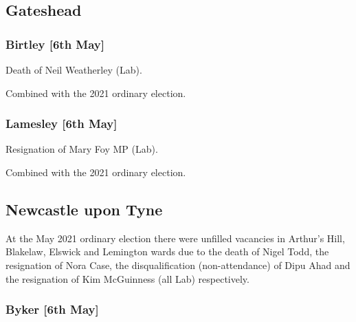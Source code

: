\documentclass[a4paper,openany]{book}
\begin{document}
\begin{resultsiii}
\subsection*{Gateshead}

\subsubsection*{Birtley \hspace*{\fill}\nolinebreak[1]%
	\enspace\hspace*{\fill}
	[6th May]}


Death of Neil Weatherley (Lab).

Combined with the 2021 ordinary election.

\subsubsection*{Lamesley \hspace*{\fill}\nolinebreak[1]%
	\enspace\hspace*{\fill}
	[6th May]}


Resignation of Mary Foy MP (Lab).

Combined with the 2021 ordinary election.

\subsection*{Newcastle upon Tyne}

At the May 2021 ordinary election there were unfilled vacancies in Arthur's Hill, Blakelaw, Elswick and Lemington wards due to the death of Nigel Todd, the resignation of Nora Case, the disqualification (non-attendance) of Dipu Ahad and the resignation of Kim McGuinness (all Lab) respectively.

\subsubsection*{Byker \hspace*{\fill}\nolinebreak[1]%
	\enspace\hspace*{\fill}
	[6th May]}


\end{resultsiii}
\end{document}
